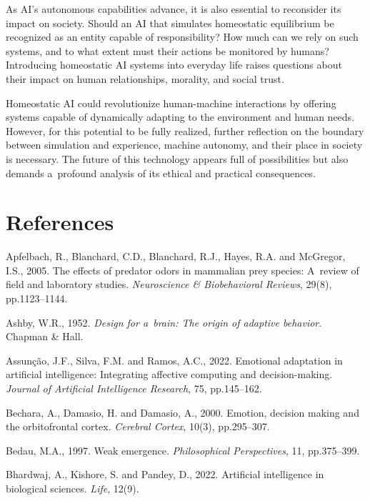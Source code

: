 As AI's autonomous capabilities advance, it is also essential to reconsider its impact on society. Should an AI that simulates homeostatic equilibrium be recognized as an entity capable of responsibility? How much can we rely on such systems, and to what extent must their actions be monitored by humans? Introducing homeostatic AI systems into everyday life raises questions about their impact on human relationships, morality, and social trust.



Homeostatic AI could revolutionize human-machine interactions by offering systems capable of dynamically adapting to the environment and human needs. However, for this potential to be fully realized, further reflection on the boundary between simulation and experience, machine autonomy, and their place in society is necessary. The future of this technology appears full of possibilities but also demands a~profound analysis of its ethical and practical consequences.



\section*{References}

Apfelbach, R., Blanchard, C.D., Blanchard, R.J., Hayes, R.A. and McGregor, I.S., 2005. The effects of predator odors in mammalian prey species: A~review of field and laboratory studies. \textit{Neuroscience \& Biobehavioral Reviews}, 29(8), pp.1123–1144.



Ashby, W.R., 1952. \textit{Design for a~brain: The origin of adaptive behavior}. Chapman \& Hall.



Assunção, J.F., Silva, F.M. and Ramos, A.C., 2022. Emotional adaptation in artificial intelligence: Integrating affective computing and decision-making. \textit{Journal of Artificial Intelligence Research}, 75, pp.145–162.



Bechara, A., Damasio, H. and Damasio, A., 2000. Emotion, decision making and the orbitofrontal cortex. \textit{Cerebral Cortex}, 10(3), pp.295–307.



Bedau, M.A., 1997. Weak emergence. \textit{Philosophical Perspectives}, 11, pp.375–399.



Bhardwaj, A., Kishore, S. and Pandey, D., 2022. Artificial intelligence in biological sciences. \textit{Life}, 12(9).




